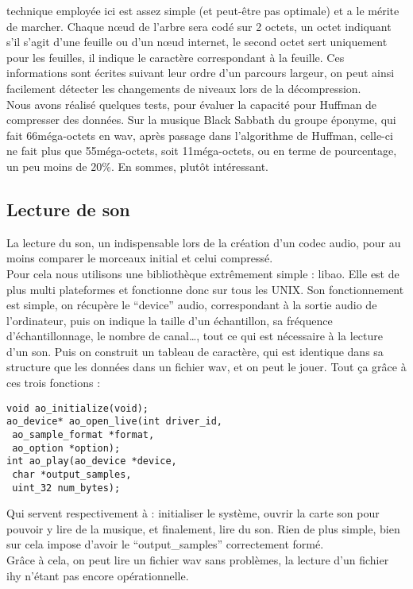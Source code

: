 \documentclass[a4paper,12pt]{article}
\begin{document}
technique employée ici est assez simple (et peut-être pas optimale) et a le
mérite de marcher. Chaque nœud de l'arbre sera codé sur 2 octets, un octet
indiquant s'il s'agit d'une feuille ou d'un nœud internet, le second octet sert
uniquement pour les feuilles, il indique le caractère correspondant à la
feuille. Ces informations sont écrites suivant leur ordre d'un parcours largeur,
on peut ainsi facilement détecter les changements de niveaux lors de la
décompression.\\
Nous avons réalisé quelques tests, pour évaluer la capacité pour Huffman de
compresser des données. Sur la musique Black Sabbath du groupe éponyme, qui fait
66méga-octets en wav, après passage dans l'algorithme de Huffman, celle-ci ne
fait plus que 55méga-octets, soit 11méga-octets, ou en terme de pourcentage, un
peu moins de 20\%. En sommes, plutôt intéressant.\\

	\subsection{Lecture de son}
La lecture du son, un indispensable lors de la création d'un codec audio, pour
au moins comparer le morceaux initial et celui compressé.\\ Pour cela nous
utilisons une bibliothèque extrêmement simple : libao.  Elle est de plus multi
plateformes et fonctionne donc sur tous les UNIX.  Son fonctionnement est
simple, on récupère le ``device'' audio, correspondant à la sortie audio de
l'ordinateur, puis on indique la taille d'un échantillon, sa fréquence
d'échantillonnage, le nombre de canal\ldots, tout ce qui est nécessaire à la
lecture d'un son. Puis on construit un tableau de caractère, qui est identique
dans sa structure que les données dans un fichier wav, et on peut le jouer. Tout
ça grâce à ces trois fonctions :
\newpage
\begin{verbatim}
void ao_initialize(void);
ao_device* ao_open_live(int driver_id,
 ao_sample_format *format,
 ao_option *option);
int ao_play(ao_device *device,
 char *output_samples,
 uint_32 num_bytes);
\end{verbatim}
Qui servent respectivement à : initialiser le système, ouvrir la carte son pour
pouvoir y lire de la musique, et finalement, lire du son. Rien de plus simple,
bien sur cela impose d'avoir le ``output\_samples'' correctement formé.\\
Grâce à cela, on peut lire un fichier wav sans problèmes, la lecture d'un
fichier ihy n'étant pas encore opérationnelle.\\
\end{document}

